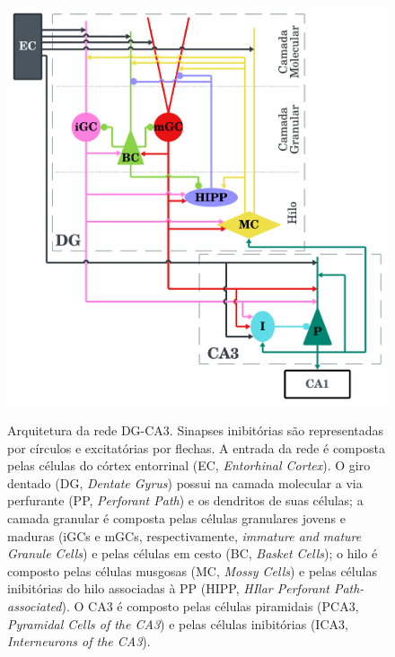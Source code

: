 \begin{figure}
    \centering
    \caption{ Arquitetura da rede DG-CA3. Sinapses inibitórias são representadas por círculos e excitatórias por flechas. A
        entrada da rede é composta pelas células do córtex entorrinal (EC, \textit{Entorhinal Cortex}). O giro dentado (DG,
        \textit{Dentate Gyrus}) possui na camada molecular a via perfurante (PP, \textit{Perforant Path}) e os dendritos de suas
        células; a camada granular é composta pelas células granulares jovens e maduras (iGCs e mGCs, respectivamente,
        \textit{immature and mature Granule Cells}) e pelas células em cesto (BC, \textit{Basket Cells}); o hilo é composto pelas
        células musgosas (MC, \textit{Mossy Cells}) e pelas células inibitórias do hilo associadas à PP (HIPP, \textit{HIlar
        Perforant Path-associated}). O CA3 é composto pelas células piramidais (PCA3, \textit{Pyramidal Cells of the CA3}) e pelas
        células inibitórias (ICA3, \textit{Interneurons of the CA3}).}
    \includegraphics[width=\textwidth]{figuras/arquitetura-rede.png}
    \label{fig:arquitetura-rede}
\end{figure}

